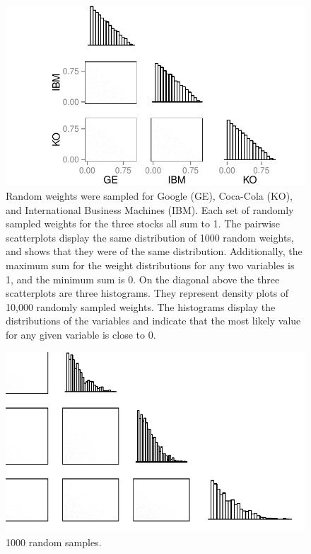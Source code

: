 \documentclass{article}\usepackage{graphicx, color}
\makeatletter
\def\maxwidth{ %
  \ifdim\Gin@nat@width>\linewidth
    \linewidth
  \else
    \Gin@nat@width
  \fi
}
\newenvironment{knitrout}{}{} %
\makeatother
\begin{document}
\begin{figure}[H]
\begin{knitrout}
\color{fgcolor}
\includegraphics[width=\maxwidth]{figure/figChunk1} 

\end{knitrout}

\caption{Random weights were sampled for Google (GE), Coca-Cola (KO), and International Business Machines (IBM). Each set of randomly sampled weights for the three stocks all sum to 1. The pairwise scatterplots display the same distribution of 1000 random weights, and shows that they were of the same distribution. Additionally, the maximum sum for the weight distributions for any two variables is 1, and the minimum sum is 0. On the diagonal above the three scatterplots are three histograms. They represent density plots of 10,000 randomly sampled weights. The histograms display the distributions of the variables and indicate that the most likely value for any given variable is close to 0.}
\end{figure}

\begin{figure}[H]
\begin{knitrout}
\color{fgcolor}
\includegraphics[width=\maxwidth]{figure/fiveByFiveGrid} 

\end{knitrout}

\caption{1000 random samples.}
\end{figure}
\end{document}
